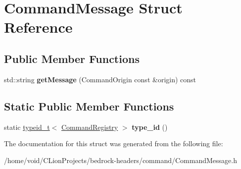 \hypertarget{struct_command_message}{}\section{Command\+Message Struct Reference}
\label{struct_command_message}
\subsection*{Public Member Functions}
\begin{DoxyCompactItemize}
\item 
\mbox{\label{struct_command_message_a7dd5f82ba953aa0d11dfd89a8fbe8802}} 
std\+::string {\bfseries get\+Message} (Command\+Origin const \&origin) const
\end{DoxyCompactItemize}
\subsection*{Static Public Member Functions}
\begin{DoxyCompactItemize}
\item 
\mbox{\label{struct_command_message_af0939b57076ee1771ff0a32a7c7c6be2}} 
static \mbox{\hyperlink{structtypeid__t}{typeid\+\_\+t}}$<$ \mbox{\hyperlink{struct_command_registry}{Command\+Registry}} $>$ {\bfseries type\+\_\+id} ()
\end{DoxyCompactItemize}


The documentation for this struct was generated from the following file\+:\begin{DoxyCompactItemize}
\item 
/home/void/\+C\+Lion\+Projects/bedrock-\/headers/command/Command\+Message.\+h\end{DoxyCompactItemize}
